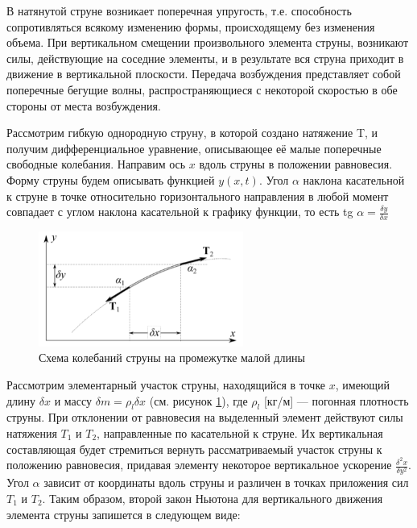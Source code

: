 \documentclass[a4paper,12pt]{article} %
\begin{document}
В натянутой струне возникает поперечная упругость, т.е. способность
сопротивляться всякому изменению формы, происходящему без изменения
объема. При вертикальном смещении произвольного элемента струны, возникают силы, действующие на соседние элементы, и в результате вся
струна приходит в движение в вертикальной плоскости. Передача возбуждения представляет собой поперечные
бегущие волны, распространяющиеся с некоторой скоростью в обе стороны от места возбуждения.

Рассмотрим гибкую однородную струну, в которой создано натяжение T, и получим дифференциальное уравнение, описывающее её малые
поперечные свободные колебания. Направим ось $ x $ вдоль струны в положении равновесия. Форму струны
будем описывать функцией $ y(x, t) $. Угол $ \alpha $ наклона касательной к
струне в точке относительно горизонтального направления в любой момент совпадает с углом наклона касательной к графику функции, то есть tg $ \alpha = \frac{\delta y}{\delta x} $

\begin{figure}[h]
\begin{center}
\includegraphics[width=0.6\textwidth]{1.4.5 waveEquation.PNG}
\end{center}
\caption{Схема колебаний струны на промежутке малой длины}
\label{fig:waveEquation}
\end{figure}

Рассмотрим элементарный участок струны, находящийся в точке $ x $,
имеющий длину $ \delta x $ и массу $ \delta m = \rho_l \delta x$ (см. рисунок \ref{fig:waveEquation}), где $ \rho_l $ [кг/м] — погонная плотность струны. При отклонении от равновесия
на выделенный элемент действуют силы натяжения $ T_1 $ и $ T_2 $, направленные
по касательной к струне. Их вертикальная составляющая будет стремиться
вернуть рассматриваемый участок струны к положению равновесия, придавая элементу некоторое вертикальное ускорение $ \frac{\delta^2 x}{\delta y^2}$. Угол $ \alpha $
зависит от координаты вдоль струны и различен в точках приложения
сил $ T_1 $ и $ T_2 $. Таким образом, второй закон Ньютона для вертикального движения элемента струны запишется в следующем виде:
\end{document}
